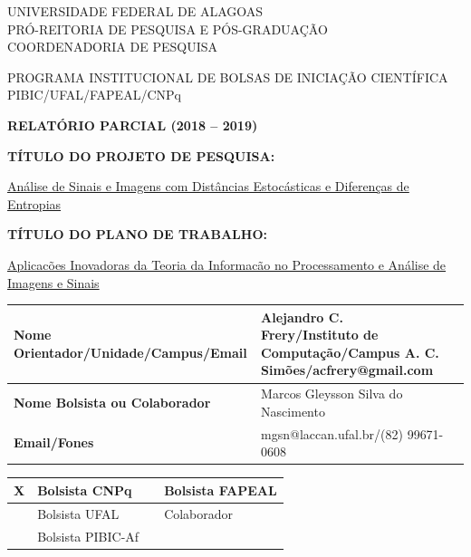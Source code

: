 \documentclass[12pt]{article}
\begin{document}
\thispagestyle{empty}
\begin{center}
\vspace{0.2cm}

\hrulefill

UNIVERSIDADE FEDERAL DE ALAGOAS\\
PRÓ-REITORIA DE PESQUISA E PÓS-GRADUAÇÃO\\
COORDENADORIA DE PESQUISA

\hrulefill

\vspace{0.5cm}

PROGRAMA INSTITUCIONAL DE BOLSAS DE INICIAÇÃO CIENTÍFICA\\PIBIC/UFAL/FAPEAL/CNPq

\vspace{1.0cm}

\textbf{\Large{RELATÓRIO PARCIAL (2018 -- 2019)}}\\

\end{center}

\vspace{1.2cm}

\textbf{TÍTULO DO PROJETO DE PESQUISA:}

\underline{Análise de Sinais e Imagens com Distâncias Estocásticas e Diferenças de Entropias}

\textbf{TÍTULO DO PLANO DE TRABALHO:}

\underline{Aplicacões Inovadoras da Teoria da Informacão no Processamento e Análise de Imagens e Sinais}

\vspace{1cm}

\begin{table}[!h]
\begin{center}
\begin{tabularx}{\textwidth}{|X|X|X|}
\hline                              
\textbf{Nome Orientador/Unidade/Campus/Email} &  Alejandro C. Frery/Instituto de Computação/Campus A. C. Simões/acfrery@gmail.com\\
\hline     
\textbf{Nome Bolsista ou Colaborador} & Marcos Gleysson Silva do Nascimento\\
\hline     
\textbf{Email/Fones} & mgsn@laccan.ufal.br/(82) 99671-0608\\
\hline     
\end{tabularx}
\end{center}
\end{table}

\begin{table}[!h]
\begin{center}
\begin{tabularx}{\textwidth}{|X|X|X|X|}
\hline                              
X & Bolsista CNPq &  & Bolsista FAPEAL\\
\hline             
& Bolsista UFAL &  & Colaborador\\
\hline             
& Bolsista PIBIC-Af &  &\\
\hline     
\end{tabularx}
\end{center}
\end{table}
\end{document}
